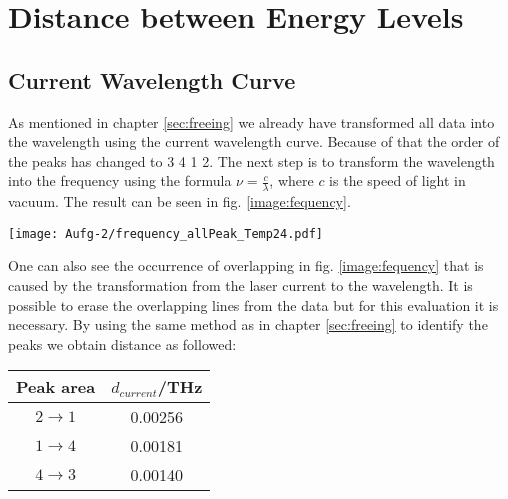 \section{Distance between Energy Levels}
\label{sec:distance}
\subsection*{Current Wavelength Curve}
As mentioned in chapter \ref{sec:freeing} we already have transformed all data into the wavelength using the current wavelength curve. Because of that the order of the peaks has changed to 3 4 1 2. The next step is to transform the wavelength into the frequency using the formula $\nu=\frac{c}{\lambda}$, where $c$ is the speed of light in vacuum. The result can be seen in fig. \ref{image:fequency}.
\begin{center}
    \texttt{[image: Aufg-2/frequency\_allPeak\_Temp24.pdf]}
    \label{image:fequency}
\end{center}
One can also see the occurrence of overlapping in fig. \ref{image:fequency} that is caused by the transformation from the laser current to the wavelength. It is possible to erase the overlapping lines from the data but for this evaluation it is necessary.
By using the same method as in chapter \ref{sec:freeing} to identify the peaks we obtain distance as followed:
\begin{center}
    \begin{tabular}{c | c}
        Peak area & $d_{current}$/THz\\
        \hline
        $2 \rightarrow 1$ & 0.00256\\
        $1 \rightarrow 4$ & 0.00181\\
        $4 \rightarrow 3$ & 0.00140\\
    \end{tabular}
    \label{tab:currentMethode}
\end{center}
